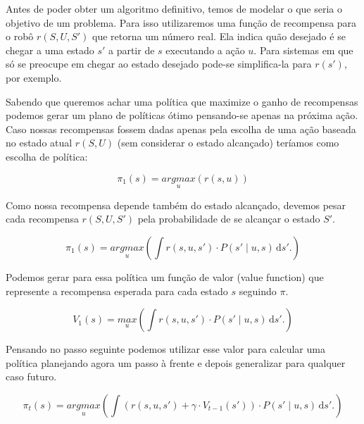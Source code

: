 Antes de poder obter um algoritmo definitivo, temos de modelar o que seria o objetivo de um problema. Para isso utilizaremos uma função de recompensa para o robô $ r \left( S, U, S' \right) $ que retorna um número real. Ela indica quão desejado é se chegar a uma estado $ s' $ a partir de $ s $ executando a ação $ u $. Para sistemas em que só se preocupe em chegar ao estado desejado pode-se simplifica-la para $ r \left( s' \right) $, por exemplo.

Sabendo que queremos achar uma política que maximize o ganho de recompensas podemos gerar um plano de políticas ótimo pensando-se apenas na próxima ação. Caso nossas recompensas fossem dadas apenas pela escolha de uma ação baseada no estado atual $ r \left( S, U \right) $ (sem considerar o estado alcançado) teríamos como escolha de política:

\begin{equation}
    \pi_1 \left( s \right) = \underset{u}{argmax} \left( r \left( s, u \right) \right)
\end{equation}

Como nossa recompensa depende também do estado alcançado, devemos pesar cada recompensa $ r \left( S, U, S' \right) $ pela probabilidade de se alcançar o estado $ S' $.

\begin{equation}
    \pi_1 \left( s \right) = \underset{u}{argmax} \left( \int \! r \left( s, u, s' \right) \cdot P \left( s' \mid u, s \right) \, \mathrm{d}s'. \right)
\end{equation}

Podemos gerar para essa política um função de valor (value function) que represente a recompensa esperada para cada estado $ s $ seguindo $ \pi $.

\begin{equation}
    V_1 \left( s \right) = \underset{u}{max} \left( \int \! r \left( s, u, s' \right) \cdot P \left( s' \mid u, s \right) \, \mathrm{d}s'. \right)
\end{equation}

Pensando no passo seguinte podemos utilizar esse valor para calcular uma política planejando agora um passo à frente e depois generalizar para qualquer caso futuro.

\begin{equation}
    \pi_t \left( s \right) = \underset{u}{argmax} \left( \int \! \left( r \left( s, u, s' \right) + \gamma \cdot V_{t-1} \left( s' \right) \right) \cdot P \left( s' \mid u, s \right) \, \mathrm{d}s'. \right)
\end{equation}

